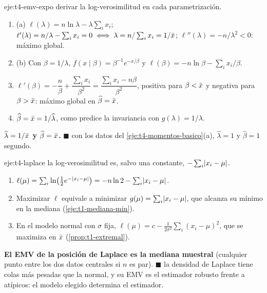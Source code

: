 \begin{solucion}{eje:t4-emv-expo}
\planteamiento derivar la log-verosimilitud en cada parametrización.
\pasos
\begin{enumerate}[label=\arabic*.]
  \item (a) $\ell(\lambda)=n\ln\lambda-\lambda\sum_ix_i$; $\ell'(\lambda)=n/\lambda-\sum_ix_i=0\iff\lambda=n/\sum_ix_i=1/\bar{x}$; $\ell''(\lambda)=-n/\lambda^{2}<0$: máximo global.
  \item (b) Con $\beta=1/\lambda$, $f(x\mid\beta)=\beta^{-1}e^{-x/\beta}$ y $\ell(\beta)=-n\ln\beta-\sum_ix_i/\beta$.
  \item $\ell'(\beta)=-\dfrac n\beta+\dfrac{\sum_ix_i}{\beta^{2}}=\dfrac{\sum_ix_i-n\beta}{\beta^{2}}$, positiva para $\beta<\bar{x}$ y negativa para $\beta>\bar{x}$: máximo global en $\widehat\beta=\bar{x}$.
  \item $\widehat\beta=\bar{x}=1/\widehat\lambda$, como predice la invariancia con $g(\lambda)=1/\lambda$.
\end{enumerate}
\resultado \textbf{$\widehat\lambda=1/\bar{x}$ y $\widehat\beta=\bar{x}$.} $\blacksquare$
\comprobacion con los datos del \cref{eje:t4-momentos-basico}(a), $\widehat\lambda=1$ y $\widehat\beta=1$ segundo.
\end{solucion}

\begin{solucion}{eje:t4-laplace}
\planteamiento la log-verosimilitud es, salvo una constante, $-\sum_i\lvert x_i-\mu\rvert$.
\pasos
\begin{enumerate}[label=\arabic*.]
  \item $\ell(\mu)=\sum_i\ln\bigl(\tfrac12e^{-\lvert x_i-\mu\rvert}\bigr)=-n\ln2-\sum_i\lvert x_i-\mu\rvert$.
  \item Maximizar $\ell$ equivale a minimizar $g(\mu)=\sum_i\lvert x_i-\mu\rvert$, que alcanza su mínimo en la mediana (\cref{eje:t1-mediana-min}).
  \item En el modelo normal con $\sigma$ fija, $\ell(\mu)=c-\frac{1}{2\sigma^{2}}\sum_i(x_i-\mu)^{2}$, que se maximiza en $\bar{x}$ (\cref{prop:t1-extremal}).
\end{enumerate}
\resultado \textbf{El EMV de la posición de Laplace es la mediana muestral} (cualquier punto entre los dos datos centrales si $n$ es par). $\blacksquare$
\comprobacion la densidad de Laplace tiene colas más pesadas que la normal, y su EMV es el estimador robusto frente a atípicos: el modelo elegido determina el estimador.
\end{solucion}

